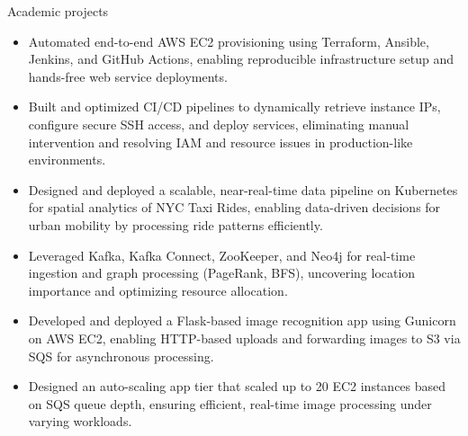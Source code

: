 \documentclass{resume}
\begin{document}
\begin{experienceSection}{Academic projects}
    \projectItem[
        title={End-to-End Deployment Automation},
        duration={Mar 2025 - Apr 2025},
    ]
    \begin{itemize}
        \vspace{-0.5em}
        \itemsep -6pt {}
        \item Automated end-to-end AWS EC2 provisioning using Terraform, Ansible, Jenkins, and GitHub Actions, enabling reproducible infrastructure setup and hands-free web service deployments.
        \item Built and optimized CI/CD pipelines to dynamically retrieve instance IPs, configure secure SSH access, and deploy services, eliminating manual intervention and resolving IAM and resource issues in production-like environments.
    \end{itemize}

    \projectItem[
        title=Kubernetes based Data Processing Pipeline,
        duration={Oct 2024 - Nov 2024},
    ]
    \begin{itemize}
        \vspace{-0.5em}
        \itemsep -6pt {}
        \item Designed and deployed a scalable, near-real-time data pipeline on Kubernetes for spatial analytics of NYC Taxi Rides, enabling data-driven decisions for urban mobility by processing ride patterns efficiently.
        \item Leveraged Kafka, Kafka Connect, ZooKeeper, and Neo4j for real-time ingestion and graph processing (PageRank, BFS), uncovering location importance and optimizing resource allocation.
    \end{itemize}

    \projectItem[
        title=AWS-Based Face Recognition App,
        duration={Feb 2024 - May 2024},
    ]
    \begin{itemize}
        \vspace{-0.5em}
        \itemsep -6pt {}
        \item Developed and deployed a Flask-based image recognition app using Gunicorn on AWS EC2, enabling HTTP-based uploads and forwarding images to S3 via SQS for asynchronous processing.
        \item Designed an auto-scaling app tier that scaled up to 20 EC2 instances based on SQS queue depth, ensuring efficient, real-time image processing under varying workloads.
    \end{itemize}


\end{experienceSection}
\end{document}
